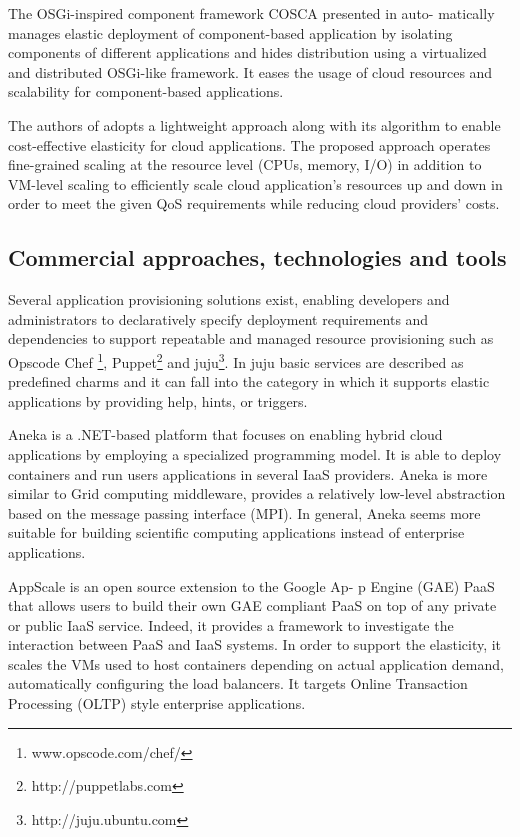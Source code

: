 \documentclass{sig-alternate}
\begin{document}
The OSGi-inspired component framework COSCA presented in \cite {kachele2013component} auto- matically manages elastic deployment of component-based application by isolating components of different applications and hides distribution using a virtualized and distributed OSGi-like framework. It eases the usage of cloud resources and scalability for component-based applications. 

The authors of \cite{han2012lightweight} adopts a lightweight approach along with its algorithm to enable cost-effective elasticity for cloud applications. The proposed approach operates fine-grained scaling at the resource level (CPUs, memory, I/O) in addition to VM-level scaling to efficiently scale cloud application’s resources up and down in order to meet the given QoS requirements while reducing cloud providers’ costs.


\subsection{Commercial approaches, technologies and tools}
\label{sec:tools}
Several application provisioning solutions exist, enabling developers and administrators to declaratively specify deployment requirements and dependencies to support repeatable and managed resource provisioning such as Opscode Chef \footnote{www.opscode.com/chef/}, Puppet\footnote{http://puppetlabs.com} and juju\footnote{http://juju.ubuntu.com}. In juju basic services are described as predefined charms and it can fall into the category in which it supports elastic applications by providing help, hints, or triggers.
 
Aneka \cite{vecchiola2009aneka} is a .NET-based platform that focuses on enabling hybrid cloud applications by employing a specialized programming model. It is able to deploy containers and run users applications in several IaaS providers. Aneka is more similar to Grid computing middleware, provides a relatively low-level abstraction based on the message passing interface (MPI). In general, Aneka seems more suitable for building scientific computing applications instead of enterprise applications. 

AppScale \cite{chohan2009appscale} is an open source extension to the Google Ap-
p Engine (GAE) PaaS that allows users to build their own GAE compliant PaaS on top of any private or public IaaS service. Indeed, it provides a framework to investigate the interaction between PaaS and IaaS systems. In order to support the elasticity, it scales the VMs used to host containers depending on actual application demand, automatically configuring the load balancers. It targets Online Transaction Processing (OLTP) style enterprise applications.
\end{document}
